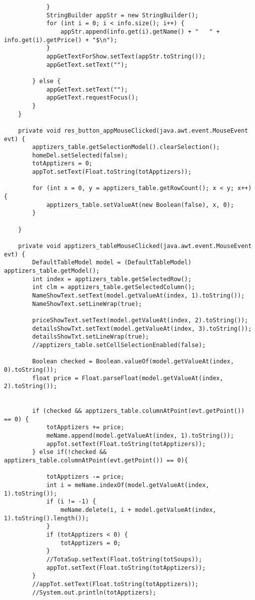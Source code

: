 \documentclass[12pt,a4paper]{article}
\begin{document}
\begin{lstlisting}
            }
            StringBuilder appStr = new StringBuilder();
            for (int i = 0; i < info.size(); i++) {
                appStr.append(info.get(i).getName() + "   " + info.get(i).getPrice() + "$\n");
            }
            appGetTextForShow.setText(appStr.toString());
            appGetText.setText("");

        } else {
            appGetText.setText("");
            appGetText.requestFocus();
        }
    }                                                       

    private void res_button_appMouseClicked(java.awt.event.MouseEvent evt) {                                            
        apptizers_table.getSelectionModel().clearSelection();
        homeDel.setSelected(false);
        totApptizers = 0;
        appTot.setText(Float.toString(totApptizers));

        for (int x = 0, y = apptizers_table.getRowCount(); x < y; x++) {
            apptizers_table.setValueAt(new Boolean(false), x, 0);
        }

    }                                           
    
    private void apptizers_tableMouseClicked(java.awt.event.MouseEvent evt) {                                             
        DefaultTableModel model = (DefaultTableModel) apptizers_table.getModel();
        int index = apptizers_table.getSelectedRow();
        int clm = apptizers_table.getSelectedColumn();
        NameShowText.setText(model.getValueAt(index, 1).toString());
        NameShowText.setLineWrap(true);

        priceShowText.setText(model.getValueAt(index, 2).toString());
        detailsShowTxt.setText(model.getValueAt(index, 3).toString());
        detailsShowTxt.setLineWrap(true);
        //apptizers_table.setCellSelectionEnabled(false);

        Boolean checked = Boolean.valueOf(model.getValueAt(index, 0).toString());
        float price = Float.parseFloat(model.getValueAt(index, 2).toString());
        
        
        if (checked && apptizers_table.columnAtPoint(evt.getPoint()) == 0) {
            totApptizers += price;
            meName.append(model.getValueAt(index, 1).toString());
            appTot.setText(Float.toString(totApptizers));
        } else if(!checked && apptizers_table.columnAtPoint(evt.getPoint()) == 0){
            
            totApptizers -= price;
            int i = meName.indexOf(model.getValueAt(index, 1).toString());
            if (i != -1) {
                meName.delete(i, i + model.getValueAt(index, 1).toString().length());
            }
            if (totApptizers < 0) {
                totApptizers = 0;
            }
            //TotaSup.setText(Float.toString(totSoups));
            appTot.setText(Float.toString(totApptizers));
        }
        //appTot.setText(Float.toString(totApptizers));
        //System.out.println(totApptizers);



\end{lstlisting}
\end{document}
